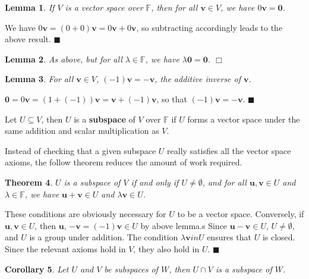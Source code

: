 \documentclass[letter-paper]{tufte-book}
\newtheorem{theorem}{\color{pastel-blue}Theorem}[section]
\newtheorem{lemma}[theorem]{\color{pastel-blue}Lemma}
\newtheorem{corollary}[theorem]{\color{pastel-blue}Corollary}
\newenvironment{proof}[1][Proof]{\begin{trivlist}
\item[\hskip \labelsep {\bfseries #1}]}{\end{trivlist}}
\newcommand{\ub}{{\boldsymbol{u}}}
\newcommand{\vb}{{\boldsymbol{v}}}
\newcommand{\qed}{\hfill$\blacksquare$}
\newcommand{\qedwhite}{\hfill \ensuremath{\Box}}
\begin{document}
\begin{lemma}
  If $V$ is a vector space over $\mathbb{F}$, then for all $\vb \in V$, we have
  $0\vb = \boldsymbol{0}$.
\end{lemma}

\begin{proof}
  We have $0\vb = (0 + 0)\vb = 0\vb + 0\vb$, so subtracting accordingly leads to
  the above result. \qed
\end{proof}

\begin{lemma}
  As above, but for all $\lambda \in \mathbb{F}$, we have $\lambda
  \boldsymbol{0} = \boldsymbol{0}$. \qedwhite
\end{lemma}

\begin{lemma}
  For all $\vb\in V$, $(-1)\vb = -\vb$, the additive inverse of $\vb$.
\end{lemma}

\begin{proof}
  $\boldsymbol{0} = 0\vb = (1 + (-1))\vb = \vb + (-1)\vb$, so that $(-1)\vb =
  -\vb$. \qed
\end{proof}

Let $U \subseteq V$, then $U$ is a \textbf{subspace} of $V$ over $\mathbb{F}$ if $U$ forms a vector space under the same addition and scalar multiplication as $V$.

Instead of checking that a given subspace $U$ really satisfies all the vector
space axioms, the follow theorem reduces the amount of work required.

\begin{theorem}
  $U$ is a subspace of $V$ if and only if $U \neq \emptyset$, and for all $\ub,
  \vb \in U$ and $\lambda \in \mathbb{F}$, we have $\ub + \vb \in U$ and
  $\lambda \vb \in U$.
\end{theorem}

\begin{proof}
  These conditions are obviously necessary for $U$ to be a vector space.
  Conversely, if $\ub, \vb \in U$, then $\ub$, $-\vb = (-1)\vb \in U$ by above
  lemma.s Since $\ub - \vb \in U$, $U \neq \emptyset$, and $U$ is a group under
  addition. The condition $\lambda \vb in U$ ensures that $U$ is closed. Since
  the relevant axioms hold in $V$, they also hold in $U$. \qed
\end{proof}

\begin{corollary}
  Let $U$ and $V$ be subspaces of $W$, then $U \cap V$ is a subspace of $W$.
\end{corollary}
\end{document}
